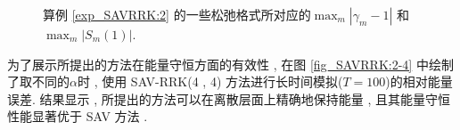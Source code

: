 \begin{figure}[H]
\begin{center}
\caption{算例 \ref{exp_SAVRRK:2} 的一些松弛格式所对应的$\max_m\left|\gamma_m-1\right|$ 和 $\max_m\left|S_m(1)\right|$.}
\label{fig_SAVRRK:2-1}
\end{center}
\end{figure}
为了展示所提出的方法在能量守恒方面的有效性 , 在图 \ref{fig_SAVRRK:2-4} 中绘制了取不同的$\alpha$时 , 使用 SAV-RRK(4 , 4) 方法进行长时间模拟($T=100$)的相对能量误差.
结果显示 , 所提出的方法可以在离散层面上精确地保持能量 , 且其能量守恒性能显著优于 SAV 方法 \cite{chengConvergenceEnergyconservingScheme2022}.


